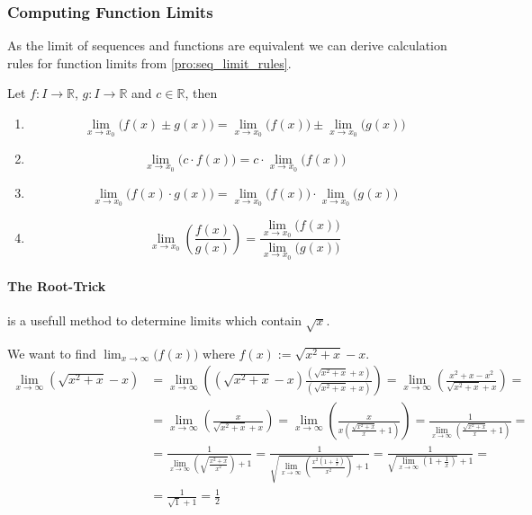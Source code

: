 \subsubsection{Computing Function Limits}
As the limit of sequences and functions are equivalent we can derive calculation rules for function limits from \cref{pro:seq_limit_rules}.
\begin{proposition}
   Let \(f: I \to \mathbb{R}\), \(g: I \to \mathbb{R}\) and \(c \in \mathbb{R}\), then

   \begin{enumerate}[label=\roman*, align=Center]
      \item \[\lim_{x \to x_0}\big(f(x) \pm g(x)\big) = \lim_{x \to x_0}\big(f(x)\big) \pm \lim_{x \to x_0}\big(g(x)\big)\]
      \item \[\lim_{x \to x_0}\big(c \cdot f(x)\big) = c \cdot \lim_{x \to x_0}\big(f(x)\big)\]
      \item \[\lim_{x \to x_0}\big(f(x) \cdot g(x)\big) = \lim_{x \to x_0}\big(f(x)\big) \cdot \lim_{x \to x_0}\big(g(x)\big)\]
      \item \[\lim_{x \to x_0}\left(\frac{f(x)}{g(x)}\right) = \frac{\lim_{x \to x_0}\big(f(x)\big)}{\lim_{x \to x_0}\big(g(x)\big)}\]
   \end{enumerate}
\end{proposition}

\paragraph{The Root-Trick} is a usefull method to determine limits which contain \(\sqrt{x}\).
\begin{example}
   We want to find \(\lim_{x \to \infty}\big(f(x)\big)\) where \(f(x) := \sqrt{x^2 + x} - x\).
\begin{equation*}
   \begin{split}
      \lim_{x \to \infty} \left(\sqrt{x^2 + x} - x\right) & = \lim_{x \to \infty} \left(\left(\sqrt{x^2 + x} - x\right) \frac{\left(\sqrt{x^2 + x} + x\right)}{\left(\sqrt{x^2 + x} + x\right)}\right) = \lim_{x \to \infty} \left(\frac{x^2 + x - x^2}{\sqrt{x^2 + x} + x}\right) =\\
                                                          & = \lim_{x \to \infty} \left(\frac{x}{\sqrt{x^2 + x} + x}\right) = \lim_{x \to \infty}\left(\frac{x}{x \left(\frac{\sqrt{x^2 + x}}{x} + 1\right)}\right) = \frac{1}{\lim_{x \to \infty}\left(\frac{\sqrt{x^2 + x}}{x} + 1\right)} =\\
                                                          & = \frac{1}{\lim_{x \to \infty}\left(\sqrt{\frac{x^2 + x}{x^2}}\right) + 1} = \frac{1}{\sqrt{\lim_{x \to \infty}\left(\frac{x^2 \left(1 + \frac{1}{x}\right)}{x^2}\right)} + 1} = \frac{1}{\sqrt{\lim_{x \to \infty}\left(1 + \frac{1}{x}\right)} + 1} =\\
                                                          & = \frac{1}{\sqrt{1} + 1} = \frac{1}{2}
   \end{split}
\end{equation*}
\end{example}

